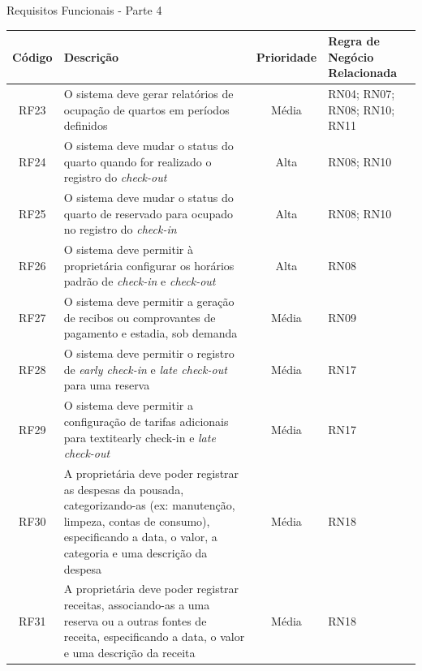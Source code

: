 \documentclass[
	12pt,				%
	openany,			%
	twoside,			%
	a4paper,			%
	english,			%
	french,				%
	spanish,			%
	brazil				%
	]{abntex2}
\begin{document}
\begin{quadro}[H]
	\caption{Requisitos Funcionais - Parte 4}
	\label{quadro_rf4}
	\begin{tabular}{|c|p{5cm}|c|p{4cm}|}
		\hline
		\textbf{Código} & \textbf{Descrição} & \textbf{Prioridade} & \textbf{Regra de Negócio Relacionada} \\ \hline
		RF23 & O sistema deve gerar relatórios de ocupação de quartos em períodos definidos & Média & RN04; RN07; RN08; RN10; RN11 \\ \hline
		RF24 & O sistema deve mudar o status do quarto quando for realizado o registro do \textit{check-out} & Alta & RN08; RN10 \\ \hline
		RF25 & O sistema deve mudar o status do quarto de reservado para ocupado no registro do \textit{check-in} & Alta & RN08; RN10 \\ \hline
			RF26 & O sistema deve permitir à proprietária configurar os horários padrão de \textit{check-in} e \textit{check-out} & Alta & RN08 \\ \hline
		RF27 & O sistema deve permitir a geração de recibos ou comprovantes de pagamento e estadia, sob demanda & Média & RN09 \\ \hline
		RF28 & O sistema deve permitir o registro de \textit{early check-in} e \textit{late check-out} para uma reserva & Média & RN17 \\ \hline
		RF29 & O sistema deve permitir a configuração de tarifas adicionais para textit{early check-in} e \textit{late check-out} & Média & RN17 \\ \hline
		RF30 & A proprietária deve poder registrar as despesas da pousada, categorizando-as (ex: manutenção, limpeza, contas de consumo), especificando a data, o valor, a categoria e uma descrição da despesa & Média & RN18 \\ \hline
		RF31 & A proprietária deve poder registrar receitas, associando-as a uma reserva ou a outras fontes de receita, especificando a data, o valor e uma descrição da receita & Média & RN18 \\ \hline
	\end{tabular}
\end{quadro}
%
\end{document}
